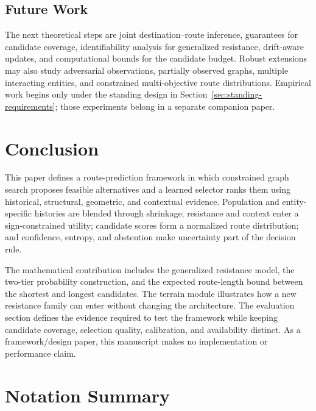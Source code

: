 \documentclass[11pt,letterpaper]{article}
\begin{document}
\subsection{Future Work}

The next theoretical steps are joint destination--route inference, guarantees for candidate coverage, identifiability analysis for generalized resistance, drift-aware updates, and computational bounds for the candidate budget. Robust extensions may also study adversarial observations, partially observed graphs, multiple interacting entities, and constrained multi-objective route distributions. Empirical work begins only under the standing design in Section~\ref{sec:standing-requirements}; those experiments belong in a separate companion paper.

\section{Conclusion}

This paper defines a route-prediction framework in which constrained graph search proposes feasible alternatives and a learned selector ranks them using historical, structural, geometric, and contextual evidence. Population and entity-specific histories are blended through shrinkage; resistance and context enter a sign-constrained utility; candidate scores form a normalized route distribution; and confidence, entropy, and abstention make uncertainty part of the decision rule.

The mathematical contribution includes the generalized resistance model, the two-tier probability construction, and the expected route-length bound between the shortest and longest candidates. The terrain module illustrates how a new resistance family can enter without changing the architecture. The evaluation section defines the evidence required to test the framework while keeping candidate coverage, selection quality, calibration, and availability distinct. As a framework/design paper, this manuscript makes no implementation or performance claim.

\appendix
\section{Notation Summary}
\end{document}
